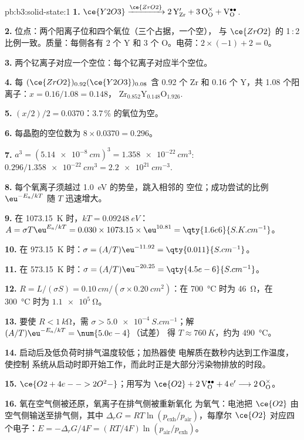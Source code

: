 \begin{solution}{pb:b3:solid-state:1}
\textbf{1.} $\ce{Y2O3} \xrightarrow{\ce{ZrO2}} \mathrm{2\,Y_{Zr}' + 3\,O_O^{\times} + V_O^{\bullet\bullet}}$.

\textbf{2.} 位点：两个阳离子位和四个氧位（三个占据，一个空），
与 $\ce{ZrO2}$ 的 1\,:\,2 比例一致。质量：每侧各有 2 个 Y 和 3 个 O。电荷：$2 \times (-1) + 2 = 0$。

\textbf{3.} 两个钇离子对应一个空位：每个钇离子对应半个空位。

\textbf{4.} 每 $(\ce{ZrO2})_{0.92}(\ce{Y2O3})_{0.08}$ 含 0.92 个 Zr 和 0.16 个 Y，共 1.08 个阳离子：$x = 0.16/1.08 = 0.148$，
$\mathrm{Zr_{0.852}Y_{0.148}O_{1.926}}$.

\textbf{5.} $(x/2)/2 = 0.0370$：3.7\,\% 的氧位为空。

\textbf{6.} 每晶胞的空位数为 $8 \times 0.0370 = 0.296$。

\textbf{7.} $a^3 = (\qty{5.14e-8}{cm})^3 = \qty{1.358e-22}{cm^3}$: $0.296/\qty{1.358e-22}{cm^3} = \qty{2.2e21}{cm^{-3}}$.

\textbf{8.} 每个氧离子须越过 \qty{1.0}{eV} 的势垒，跳入相邻的
空位；成功尝试的比例 $\eu^{-E_a/kT}$ 随 $T$ 迅速增大。

\textbf{9.} 在 \qty{1073.15}{K} 时，$kT = \qty{0.09248}{eV}$：$A = \sigma T\eu^{E_a/kT} = 0.030 \times 1073.15 \times \eu^{10.81} = \qty{1.6e6}{S.K.cm^{-1}}$。

\textbf{10.} 在 \qty{973.15}{K} 时：$\sigma = (A/T)\eu^{-11.92} = \qty{0.011}{S.cm^{-1}}$。

\textbf{11.} 在 \qty{573.15}{K} 时：$\sigma = (A/T)\eu^{-20.25} = \qty{4.5e-6}{S.cm^{-1}}$。

\textbf{12.} $R = L/(\sigma S) = \qty{0.10}{cm}/(\sigma \times \qty{0.20}{cm^2})$：在 \qty{700}{\celsius} 时为 \qty{46}{\ohm}，在 \qty{300}{\celsius} 时为 $\qty{1.1e5}{\ohm}$。

\textbf{13.} 要使 $R < \qty{1}{k\ohm}$，需 $\sigma > \qty{5.0e-4}{S.cm^{-1}}$；解 $(A/T)\eu^{-E_a/kT} = \num{5.0e-4}$（试差）
得 $T \approx \qty{760}{K}$，约为 \qty{490}{\celsius}。

\textbf{14.} 启动后及低负荷时排气温度较低；加热器使
电解质在数秒内达到工作温度，使控制
系统从启动时即开始工作，而此时正是大部分污染物排放的时段。

\textbf{15.} $\ce{O2 + 4e- -> 2O^2-}$；用写为 $\ce{O2} + \mathrm{2\,V_O^{\bullet\bullet} + 4\,e'} \longrightarrow \mathrm{2\,O_O^{\times}}$。

\textbf{16.} 氧在空气侧被还原，氧离子在排气侧被重新氧化
为氧气：电池把 $\ce{O2}$ 由空气侧输送至排气侧，其中
$\Delta_rG = RT\ln(p_{\mathrm{exh}}/p_{\mathrm{air}})$，每摩尔 $\ce{O2}$ 对应四个电子：$E = -\Delta_rG/4F = (RT/4F)\ln(p_{\mathrm{air}}/p_{\mathrm{exh}})$。


\end{solution}
